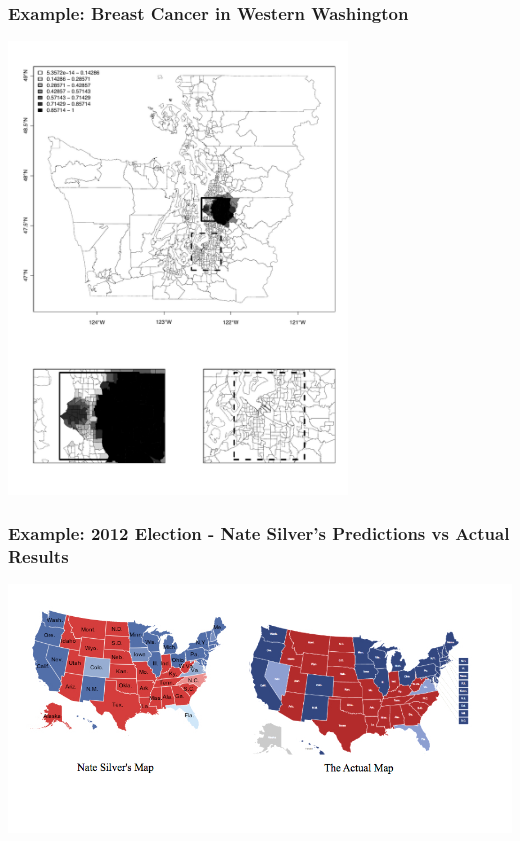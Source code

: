 \documentclass[slides]{beamer}\usepackage[]{graphicx}\usepackage[]{color}
\begin{document}
\begin{frame}[fragile]
\frametitle{Example: Breast Cancer in Western Washington}
\begin{center}
\includegraphics[width=9cm]{figure/breast_post_high}
\end{center}
\end{frame}


\begin{frame}[fragile]
\frametitle{Example: 2012 Election - Nate Silver's Predictions vs Actual Results}
\begin{center}
\includegraphics[width=\textwidth]{figure/nate_silver.jpg}
\end{center}
\begin{center}
\end{center}
\end{frame}
\end{document}
